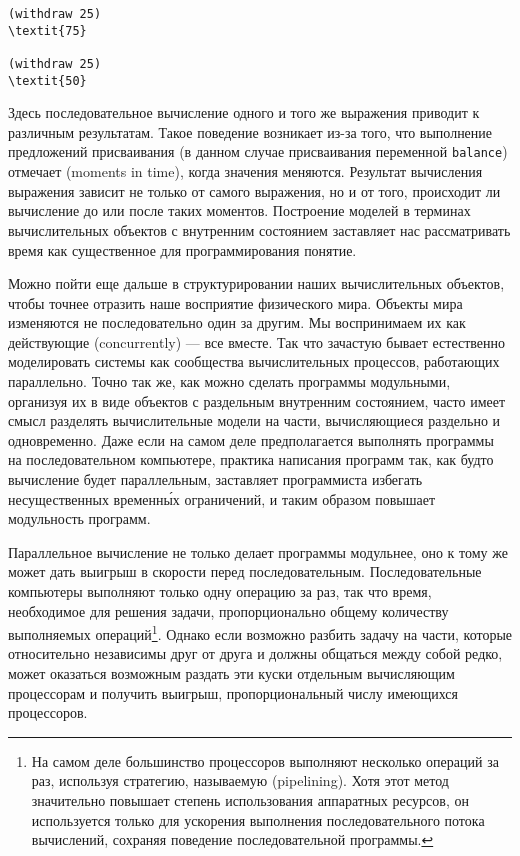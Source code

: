\begin{Verbatim}[fontsize=\small]
(withdraw 25)
\textit{75}

(withdraw 25)
\textit{50}
\end{Verbatim}
Здесь последовательное вычисление одного и того же выражения приводит
к различным результатам.  Такое поведение возникает из-за того, что
выполнение предложений присваивания (в данном случае присваивания
переменной {\tt balance}) отмечает
 (moments in time), когда значения
меняются.  Результат вычисления выражения зависит не только от самого
выражения, но и от того, происходит ли вычисление до
или после таких моментов.  Построение моделей в терминах
вычислительных объектов с внутренним состоянием заставляет нас
рассматривать время как существенное для программирования понятие.

Можно пойти еще дальше в структурировании наших
вычислительных объектов, чтобы точнее отразить наше восприятие
физического мира.  Объекты мира изменяются не последовательно один за
другим.  Мы воспринимаем их как действующие
 (concurrently) --- все вместе.  Так что
зачастую бывает естественно моделировать системы как сообщества вычислительных
процессов, работающих параллельно.  Точно так же, как можно сделать
программы модульными, организуя их в виде объектов с раздельным
внутренним состоянием, часто имеет смысл разделять вычислительные
модели на части, вычисляющиеся раздельно и одновременно.  Даже если
на самом деле предполагается выполнять программы на последовательном
компьютере, практика написания программ так, как будто вычисление
будет параллельным, заставляет программиста избегать несущественных
временн\'{ы}х ограничений, и таким образом повышает модульность
программ.

Параллельное вычисление не только делает программы модульнее,
оно к тому же может дать выигрыш в скорости перед
последовательным.  Последовательные компьютеры выполняют только одну
операцию за раз, так что время, необходимое для решения задачи,
пропорционально общему количеству выполняемых операций\footnote{На самом деле большинство процессоров выполняют несколько
операций за раз, используя стратегию, называемую
 (pipelining).  Хотя этот метод
значительно повышает степень использования аппаратных ресурсов, он
используется только для ускорения выполнения последовательного потока
вычислений, сохраняя поведение последовательной программы.
}.
Однако если возможно разбить задачу на части, которые относительно
независимы друг от друга и должны общаться между собой редко, может
оказаться возможным раздать эти куски отдельным вычисляющим
процессорам и получить выигрыш, пропорциональный числу имеющихся
процессоров.

